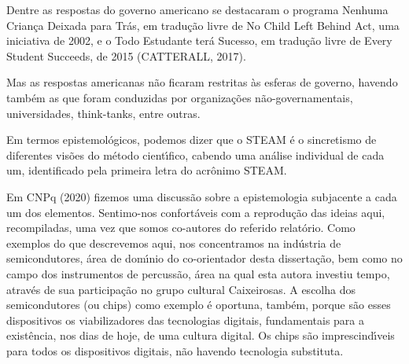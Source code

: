 \documentclass[
12pt,		%
openright,	%
twoside,  %
a4paper,			%
chapter=TITLE,		%
english,			%
french,				%
spanish,			%
brazil				%
]{USPSC-classe/USPSC}
\begin{document}
Dentre as respostas do governo americano se destacaram o programa \textquotedbl Nenhuma Crian\c{c}a Deixada para Tr\'as, em tradu\c{c}\~ao livre de \textquotedbl No Child Left Behind Act, uma iniciativa de 2002, e o \textquotedbl Todo Estudante ter\'a Sucesso, em tradu\c{c}\~ao livre de \textquotedbl Every Student Succeeds, de 2015  (CATTERALL, 2017).

















Mas as respostas americanas n\~ao ficaram restritas \`as esferas de governo, havendo tamb\'em as que foram conduzidas por organiza\c{c}\~oes n\~ao-governamentais, universidades, think-tanks, entre outras.

















Em termos epistemol\'ogicos, podemos dizer que o STEAM \'e o sincretismo de diferentes vis\~oes do m\'etodo cient\'{\i}fico, cabendo uma an\'alise individual de cada um, identificado pela primeira letra do acr\^onimo STEAM.

















Em  CNPq (2020) fizemos uma discuss\~ao sobre a epistemologia subjacente a cada um dos elementos. Sentimo-nos confort\'aveis com a reprodu\c{c}\~ao das ideias aqui, recompiladas, uma vez que somos co-autores do referido relat\'orio. Como exemplos do que descrevemos aqui, nos concentramos na ind\'ustria de semicondutores, \'area de dom\'{\i}nio do co-orientador desta disserta\c{c}\~ao, bem como no campo dos instrumentos de percuss\~ao, \'area na qual esta autora investiu tempo, atrav\'es de sua participa\c{c}\~ao no grupo cultural \textquotedbl Caixeirosas\textquotedbl . A escolha dos semicondutores (ou chips) como exemplo \'e oportuna, tamb\'em, porque s\~ao esses dispositivos os viabilizadores das tecnologias digitais, fundamentais para a exist\^encia, nos dias de hoje, de uma \textquotedbl cultura digital\textquotedbl . Os chips s\~ao imprescind\'{\i}veis para todos os dispositivos digitais, n\~ao havendo tecnologia substituta.
\end{document}
